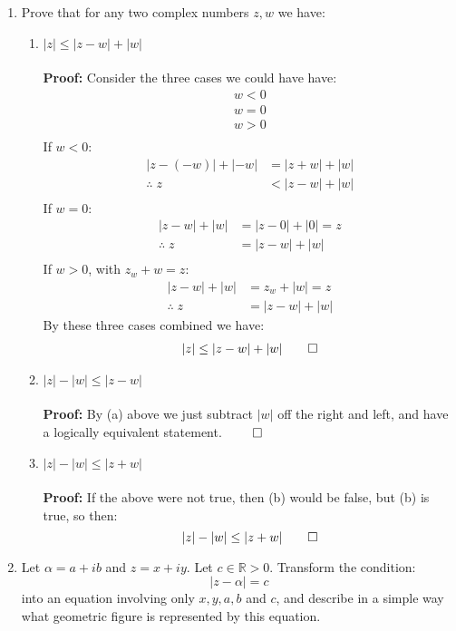 \begin{enumerate}
	\item Prove that for any two complex numbers $z, w$ we have:
	\begin{enumerate}
		\item $|z| \leq |z - w| + |w|$ \\
		\\
		\textbf{Proof:}
		Consider the three cases we could have have:
		\begin{align*}
			w < 0 \\
			w = 0 \\
			w > 0 \\
		\end{align*}
		If $w < 0$:
		\begin{align*}
			|z - (-w)| + |-w| &= |z + w| + |w| \\
			\therefore \; z &< |z - w| + |w| \\
		\end{align*}
		If $w = 0$:
		\begin{align*}
			|z - w| + |w| &= |z - 0| + |0| = z \\
			\therefore \; z &= |z -w| + |w| \\
		\end{align*} 
		If $w > 0$, with $z_w + w = z$:
		\begin{align*}
			|z - w| + |w| &= z_w + |w| = z \\
			\therefore \; z &= |z - w | + |w|
		\end{align*}
		By these three cases combined we have:
		\begin{align*}
			|z| \leq |z - w| + |w| \qed \\
		\end{align*}
		\item $|z| - |w| \leq |z - w|$ \\
		\\
		\textbf{Proof:}
		By (a) above we just subtract $|w|$ off the right and left, and have a logically equivalent statement. $\qed$
		\item $|z| - |w| \leq |z + w|$ \\
		\\
		\textbf{Proof:}
		If the above were not true, then (b) would be false, but (b) is true, so then: 
		\[|z| -|w| \leq |z + w| \qed \]
	\end{enumerate}
	
	\item Let $\alpha = a +ib$ and $z = x +iy.$ Let $c \in \mathbb{R} > 0.$ Transform the condition:
	$$|z - \alpha| = c$$
	into an equation involving only $x, y, a, b$ and $c$, and describe in a simple way what geometric figure is represented by this equation.
	

\end{enumerate}
